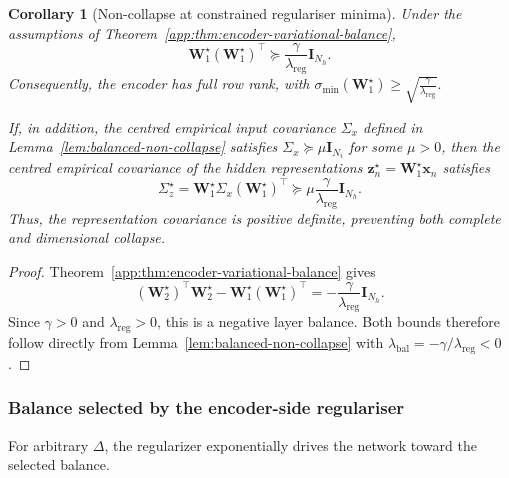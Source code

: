 \documentclass{article} %
\newcommand{\wa}{\mathbf{W}_1}
\newcommand{\wb}{\mathbf{W}_2}
\newtheorem{corollary}[theorem]{Corollary}
\theoremstyle{remark}
\begin{document}
\begin{corollary}[Non-collapse at constrained regulariser minima]
\label{cor:encoder-non-collapse}
Under the assumptions of
Theorem~\ref{app:thm:encoder-variational-balance},
\begin{equation}
\boxed{
\wa^\star(\wa^\star)^\top
\succeq
\frac{\gamma}{\lambda_{\mathrm{reg}}}
\mathbf{I}_{N_h}
}.
\label{eq:encoder-anti-collapse-bound}
\end{equation}
Consequently, the encoder has full row rank, with
$\sigma_{\min}(\wa^\star)
\geq
\sqrt{\frac{\gamma}{\lambda_{\mathrm{reg}}}}.$

If, in addition, the centred empirical input covariance $\Sigma_x$
defined in Lemma~\ref{lem:balanced-non-collapse} satisfies
$\Sigma_x\succeq\mu\mathbf{I}_{N_i}$ for some $\mu>0$,
then the centred empirical covariance of the hidden representations
$\mathbf{z}_n^\star=\wa^\star\mathbf{x}_n$ satisfies
\begin{equation}
\boxed{
\Sigma_z^\star
=
\wa^\star\Sigma_x(\wa^\star)^\top
\succeq
\mu\frac{\gamma}{\lambda_{\mathrm{reg}}}
\mathbf{I}_{N_h}
}.
\label{eq:representation-anti-collapse-bound}
\end{equation}
Thus, the representation covariance is positive definite, preventing
both complete and dimensional collapse.
\end{corollary}

\begin{proof}
Theorem~\ref{app:thm:encoder-variational-balance} gives
\[
(\wb^\star)^\top\wb^\star
-
\wa^\star(\wa^\star)^\top
=
-\frac{\gamma}{\lambda_{\mathrm{reg}}}
\mathbf{I}_{N_h}.
\]
Since $\gamma>0$ and $\lambda_{\mathrm{reg}}>0$, this is a
negative layer balance. Both bounds therefore follow directly from
Lemma~\ref{lem:balanced-non-collapse} with
$\lambda_{\mathrm{bal}}=-\gamma/\lambda_{\mathrm{reg}}<0$.
\end{proof}




\subsubsection{Balance selected by the encoder-side regulariser}\label{app:balsel}


For arbitrary $\Delta$, the regularizer exponentially drives the network toward the selected balance. 
\end{document}
